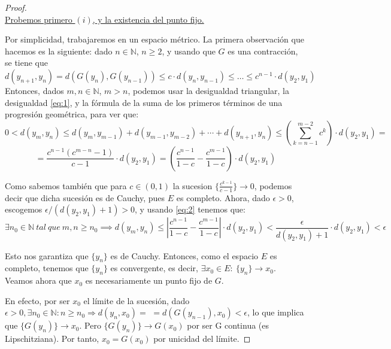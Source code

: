 \begin{proof} \hfill \\
\underline{Probemos primero $(i)$, y la existencia del punto fijo.}

Por simplicidad, trabajaremos en un espacio métrico. La primera observación que hacemos es la siguiente: dado $n \in \mathbb{N}$, $n \ge 2$, y usando que $G$ es una contracción, se tiene que
\begin{equation} \label{eq:1} \tag{$\ast$}
d(y_{n+1}, y_{n}) = d(G(y_{n}), G(y_{n-1})) \le c\cdot d(y_{n}, y_{n-1}) \le \dots \le c^{n-1}\cdot d(y_{2}, y_{1})
\end{equation}
Entonces, dados $m,n \in \mathbb{N}$, $m > n$, podemos usar la desigualdad triangular, la desigualdad \eqref{eq:1}, y la fórmula de la suma de los primeros términos de una progresión geométrica, para ver que:
$$0 < d(y_{m}, y_{n}) \leq d(y_m,y_{m-1}) + d(y_{m-1},y_{m-2}) + \cdots + d(y_ {n+1},y_{n})  \leq \left( \sum_{k=n-1}^{m-2}c^k \right) \cdot d(y_2,y_1) = $$
\begin{equation} \label{eq:2} \tag{$\ast \ast$}
= \frac{c^{n-1}(c^{m-n} - 1)}{c-1} \cdot d(y_2,y_1) = \left( \frac{c^{n-1}}{1-c} - \frac{c^{m-1}}{1-c} \right) \cdot d(y_2,y_1)
\end{equation}

Como sabemos también que para $c \in (0,1)$ la sucesion $\{\frac{c^{k-1}}{c-1}\} \rightarrow 0$, podemos decir que dicha sucesión es de Cauchy, pues $E$ es completo. Ahora, dado $\epsilon > 0$, escogemos $\epsilon / (d(y_2,y_1) + 1) > 0$, y usando \eqref{eq:2} tenemos que: $$ \exists n_{0} \in \mathbb{N} \ tal\ que\ m,n\geq n_{0} \implies d(y_{m}, y_{n}) \leq \left| \frac{c^{n-1}}{1-c} - \frac{c^{m-1}}{1-c} \right| \cdot d(y_2,y_1) < \frac{\epsilon}{d(y_2,y_1) + 1} \cdot d(y_2,y_1) < \epsilon $$

Esto nos garantiza que $\{y_{n}\}$ es de Cauchy. Entonces, como el espacio $E$ es completo, tenemos que $\{y_n\}$ es convergente, es decir, $\exists x_0 \in E:\ \{y_{n}\}\rightarrow x_0$. Veamos ahora que $x_0$ es necesariamente un punto fijo de $G$.

En efecto, por ser $x_0$ el límite de la sucesión, dado $\epsilon > 0, \exists n_0 \in \mathbb{N}: n \ge n_0 \Rightarrow d(y_n, x_0) =$ $= d(G(y_{n-1}),x_0) <  \epsilon$, lo que implica que $\{G(y_{n})\}\rightarrow x_0$. Pero $\{G(y_{n})\}\rightarrow G(x_0)$ por ser G continua (es Lipschitziana). Por tanto, $x_0 = G(x_0)$ por unicidad del límite.
\vspace{0.5em}


\end{proof}
